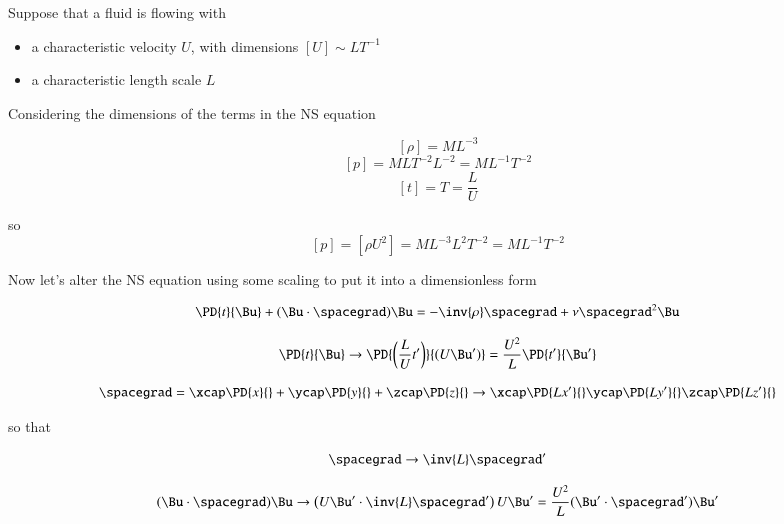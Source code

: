 Suppose that a fluid is flowing with

\begin{itemize}
\item a characteristic velocity $U$, with dimensions $[U] \sim L T^{-1}$
\item a characteristic length scale $L$
\end{itemize}

Considering the dimensions of the terms in the NS equation

\begin{equation}\label{eqn:continuumL14:230}
[\rho] = M L^{-3}
\end{equation}
\begin{equation}\label{eqn:continuumL14:250}
[p] = M L T^{-2} L^{-2} = M L^{-1} T^{-2}
\end{equation}
\begin{equation}\label{eqn:continuumL14:270}
[t] = T = \frac{L}{U}
\end{equation}

so 
\begin{equation}\label{eqn:continuumL14:290}
[p] = [\rho U^2] = M L^{-3} L^2 T^{-2}  = M L^{-1} T^{-2}
\end{equation}

Now let's alter the NS equation using some scaling to put it into a dimensionless form

\begin{equation}\label{eqn:continuumL14:310}
\PD{t}{\Bu} + (\Bu \cdot \spacegrad) \Bu = - \inv{\rho} \spacegrad + \nu \spacegrad^2 \Bu
\end{equation}

\begin{equation}\label{eqn:continuumL14:330}
\PD{t}{\Bu} \rightarrow  \PD{\left(\frac{L}{U} t'\right)}{(U \Bu')} = \frac{U^2}{L} \PD{t'}{\Bu'}
\end{equation}

\begin{equation}\label{eqn:continuumL14:350}
\spacegrad = 
\xcap \PD{x}{}
+\ycap \PD{y}{}
+\zcap \PD{z}{}
\rightarrow 
\xcap \PD{L x'}{}
\ycap \PD{L y'}{}
\zcap \PD{L z'}{}
\end{equation}

so that 

\begin{equation}\label{eqn:continuumL14:370}
\spacegrad \rightarrow \inv{L} \spacegrad'
\end{equation}

\begin{equation}\label{eqn:continuumL14:390}
(\Bu \cdot \spacegrad ) \Bu \rightarrow 
\left( U \Bu' \cdot \inv{L} \spacegrad' \right) U \Bu' = \frac{U^2}{L} (\Bu' \cdot \spacegrad') \Bu'
\end{equation}

